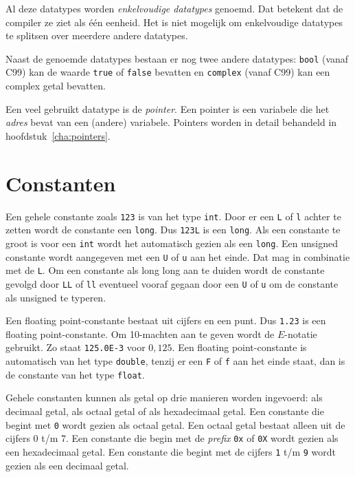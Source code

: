 Al deze datatypes worden \textsl{enkelvoudige datatypes} genoemd. Dat betekent dat de compiler ze ziet als één eenheid. Het is niet mogelijk om enkelvoudige datatypes te splitsen over meerdere andere datatypes.

Naast de genoemde datatypes bestaan er nog twee andere datatypes: \texttt{bool} (vanaf C99) kan de waarde \texttt{true} of \texttt{false} bevatten en \texttt{complex} (vanaf C99) kan een complex getal bevatten.

Een veel gebruikt datatype is de \textsl{pointer}. Een pointer is een variabele die het \textsl{adres} bevat van een (andere) variabele. Pointers worden in detail behandeld in hoofdstuk~\ref{cha:pointers}.


\section{Constanten}
Een gehele constante zoals \texttt{123} is van het type \texttt{int}. Door er een \texttt{L} of \texttt{l} achter te zetten wordt de constante een \texttt{long}. Dus \texttt{123L} is een \texttt{long}. Als een constante te groot is voor een \texttt{int} wordt het automatisch gezien als een \texttt{long}. Een unsigned constante wordt aangegeven met een \texttt{U} of \texttt{u} aan het einde. Dat mag in combinatie met de \texttt{L}. Om een constante als long long aan te duiden wordt de constante gevolgd door \texttt{LL} of \texttt{ll} eventueel vooraf gegaan door een \texttt{U} of \texttt{u} om de constante als unsigned te typeren.


Een floating point-constante bestaat uit cijfers en een punt. Dus \texttt{1.23} is een floating point-constante. Om 10-machten aan te geven wordt de $E$-notatie gebruikt. Zo staat \texttt{125.0E-3} voor $0,125$. Een floating point-constante is automatisch van het type \texttt{double}, tenzij er een \texttt{F} of \texttt{f} aan het einde staat, dan is de constante van het type \texttt{float}.

Gehele constanten kunnen als getal op drie manieren worden ingevoerd: als decimaal getal, als octaal getal of als hexadecimaal getal. Een constante die begint met \texttt{0} wordt gezien als octaal getal. Een octaal getal bestaat alleen uit de cijfers 0 t/m 7. Een constante die begin met de \textsl{prefix} \texttt{0x} of \texttt{0X} wordt gezien als een hexadecimaal getal. Een constante die begint met de cijfers \texttt{1} t/m \texttt{9} wordt gezien als een decimaal getal.

